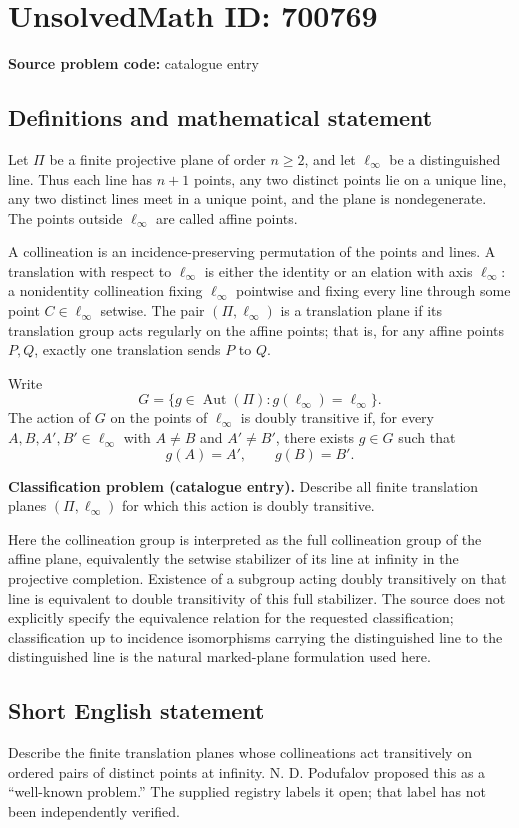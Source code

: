 \documentclass[11pt]{article}
\begin{document}
\section*{UnsolvedMath ID: 700769}
\textbf{Source problem code:} catalogue entry
\subsection{Definitions and mathematical statement}
Let \(\Pi\) be a finite projective plane of order \(n\geq 2\), and let \(\ell_\infty\) be a distinguished line. Thus each line has \(n+1\) points, any two distinct points lie on a unique line, any two distinct lines meet in a unique point, and the plane is nondegenerate. The points outside \(\ell_\infty\) are called affine points.

A collineation is an incidence-preserving permutation of the points and lines. A translation with respect to \(\ell_\infty\) is either the identity or an elation with axis \(\ell_\infty\): a nonidentity collineation fixing \(\ell_\infty\) pointwise and fixing every line through some point \(C\in\ell_\infty\) setwise. The pair \((\Pi,\ell_\infty)\) is a translation plane if its translation group acts regularly on the affine points; that is, for any affine points \(P,Q\), exactly one translation sends \(P\) to \(Q\).

Write
\[
G=\{g\in\operatorname{Aut}(\Pi):g(\ell_\infty)=\ell_\infty\}.
\]
The action of \(G\) on the points of \(\ell_\infty\) is doubly transitive if, for every \(A,B,A',B'\in\ell_\infty\) with \(A\ne B\) and \(A'\ne B'\), there exists \(g\in G\) such that
\[
g(A)=A',\qquad g(B)=B'.
\]

\textbf{Classification problem (catalogue entry).} Describe all finite translation planes \((\Pi,\ell_\infty)\) for which this action is doubly transitive.

Here the collineation group is interpreted as the full collineation group of the affine plane, equivalently the setwise stabilizer of its line at infinity in the projective completion. Existence of a subgroup acting doubly transitively on that line is equivalent to double transitivity of this full stabilizer. The source does not explicitly specify the equivalence relation for the requested classification; classification up to incidence isomorphisms carrying the distinguished line to the distinguished line is the natural marked-plane formulation used here.
\subsection{Short English statement}
Describe the finite translation planes whose collineations act transitively on ordered pairs of distinct points at infinity. N. D. Podufalov proposed this as a ``well-known problem.'' The supplied registry labels it open; that label has not been independently verified.
\end{document}
